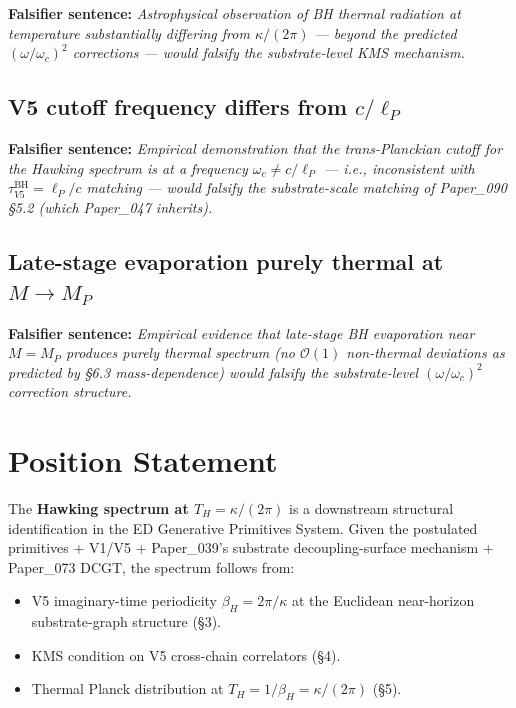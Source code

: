 \documentclass[11pt,a4paper]{article}
\begin{document}
\textbf{Falsifier sentence:} \emph{Astrophysical observation of BH thermal radiation at temperature substantially differing from $\kappa/(2\pi)$ --- beyond the predicted $(\omega/\omega_c)^2$ corrections --- would falsify the substrate-level KMS mechanism.}

\subsection{V5 cutoff frequency differs from $c/\ell_P$}

\textbf{Falsifier sentence:} \emph{Empirical demonstration that the trans-Planckian cutoff for the Hawking spectrum is at a frequency $\omega_c \neq c/\ell_P$ --- i.e., inconsistent with $\tau_{V5}^\mathrm{BH} = \ell_P/c$ matching --- would falsify the substrate-scale matching of Paper\_090 \S5.2 (which Paper\_047 inherits).}

\subsection{Late-stage evaporation purely thermal at $M \to M_P$}

\textbf{Falsifier sentence:} \emph{Empirical evidence that late-stage BH evaporation near $M = M_P$ produces purely thermal spectrum (no $\mathcal{O}(1)$ non-thermal deviations as predicted by \S6.3 mass-dependence) would falsify the substrate-level $(\omega/\omega_c)^2$ correction structure.}

\section{Position Statement}

The \textbf{Hawking spectrum at $T_H = \kappa/(2\pi)$} is a downstream structural identification in the ED Generative Primitives System. Given the postulated primitives + V1/V5 + Paper\_039's substrate decoupling-surface mechanism + Paper\_073 DCGT, the spectrum follows from:

\begin{itemize}[noitemsep]
\item V5 imaginary-time periodicity $\beta_H = 2\pi/\kappa$ at the Euclidean near-horizon substrate-graph structure (\S3).
\item KMS condition on V5 cross-chain correlators (\S4).
\item Thermal Planck distribution at $T_H = 1/\beta_H = \kappa/(2\pi)$ (\S5).
\end{itemize}
\end{document}
